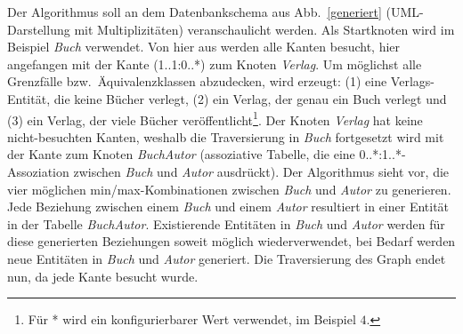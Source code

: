 	
Der Algorithmus soll an dem  Datenbankschema  aus Abb.~\ref{generiert} (UML-Darstellung mit Multiplizitäten) veranschaulicht werden. 
%
%	
%	
Als Startknoten wird im Beispiel \textit{Buch} verwendet. 
%
Von hier aus werden alle Kanten besucht, hier angefangen mit der Kante (1..1:0..*) zum Knoten \textit{Verlag}. 
%
%
Um möglichst alle Grenzfälle bzw.~Äquivalenzklassen abzudecken, wird erzeugt: (1) eine Verlags-Entität, die keine Bücher verlegt, (2) ein Verlag, der genau ein Buch verlegt und (3) ein  Verlag, der viele
Bücher veröffentlicht\footnote{Für * wird ein konfigurierbarer Wert  verwendet, im Beispiel $4$.}.
%
%
%	
Der Knoten \textit{Verlag} hat keine nicht-besuchten Kanten, weshalb die Traversierung in \textit{Buch} fortgesetzt wird mit der Kante zum Knoten \textit{BuchAutor} (assoziative Tabelle, die eine 0..*:1..*-Assoziation zwischen \textit{Buch} und \textit{Autor} ausdrückt). 
%
%
%
Der Algorithmus sieht vor, die vier möglichen min/max-Kombinationen zwischen \textit{Buch} und \textit{Autor} zu generieren. 
%
Jede Beziehung zwischen einem \textit{Buch} und einem \textit{Autor} resultiert in einer Entität in der Tabelle \textit{BuchAutor}. 
%
Existierende Entitäten in \textit{Buch} und \textit{Autor} werden für diese generierten Beziehungen soweit möglich wiederverwendet, bei Bedarf werden neue Entitäten in \textit{Buch} und \textit{Autor} generiert.
%
Die Traversierung des Graph endet nun, da jede Kante besucht wurde.
%
%
